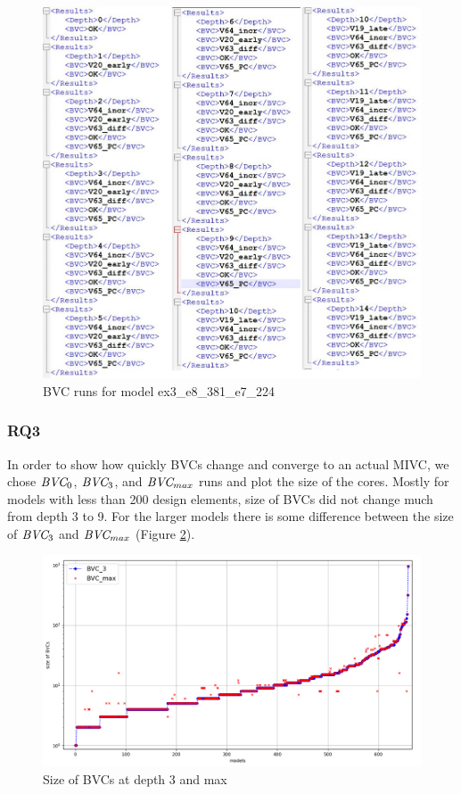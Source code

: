 \begin{figure}
 \centering
  \includegraphics[width=0.9\columnwidth]{figs/explout.png}
  \caption{BVC runs for model ex3\_e8\_381\_e7\_224}
  \vspace{0.1in}
  \label{fig:explout}
\end{figure}


\vspace{0.1in}
\subsubsection{RQ3}
In order to show how quickly BVCs change and converge to an actual MIVC, we chose $\textit{BVC} _{0}$, $\textit{BVC} _{3}$, and $\textit{BVC} _{max}$  runs and plot the size of the cores. Mostly for models with less than 200 design elements, size of BVCs did not change much from depth 3 to 9. For the larger models there is some difference between the size of $\textit{BVC} _{3}$ and $\textit{BVC} _{max}$ (Figure \ref{fig:bvc-growth}).


 \begin{figure}
 \centering
  \includegraphics[width=.85\columnwidth]{figs/bvcmax.png}
  \caption{Size of BVCs at depth 3 and max}
  \vspace{0.1in}
  \label{fig:bvc-growth}
\end{figure}


